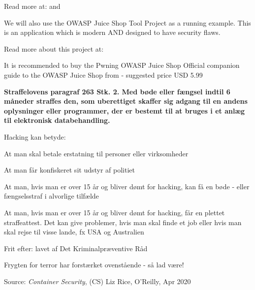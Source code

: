 \documentclass[Screen16to9,17pt]{foils}
\begin{document}
Read more at:  and 



We will also use the OWASP Juice Shop Tool Project as a running example. This is an application which is modern AND designed to have security flaws.

Read more about this project at: \\ 

It is recommended to buy the Pwning OWASP Juice Shop Official companion guide to the OWASP Juice Shop from  - suggested price USD 5.99


\vskip 1cm
{\bfseries Straffelovens paragraf 263 Stk. 2. Med bøde eller fængsel
  indtil 6 måneder
straffes den, som uberettiget skaffer sig adgang til en andens
oplysninger eller programmer, der er bestemt til at bruges i et anlæg
til elektronisk databehandling.}

Hacking kan betyde:
\begin{list2}
\item At man skal betale erstatning til personer eller virksomheder
\item At man får konfiskeret sit udstyr af politiet
\item At man, hvis man er over 15 år og bliver dømt for hacking, kan
  få en bøde - eller fængselsstraf i alvorlige tilfælde
\item At man, hvis man er over 15 år og bliver dømt for hacking, får
en plettet straffeattest. Det kan give problemer, hvis man skal finde
et job eller hvis man skal rejse til visse lande, fx USA og
Australien
\item Frit efter:  lavet af Det
  Kriminalpræventive Råd
\item Frygten for terror har forstærket ovenstående - så lad være!
\end{list2}



Source: \emph{Container Security}, (CS) Liz Rice, O'Reilly, Apr 2020
\end{document}
